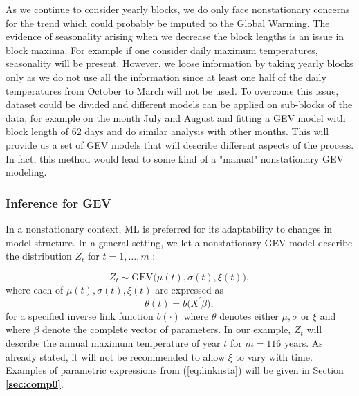 As we continue to consider yearly blocks, we do only face nonstationary concerns for the trend which could probably be imputed to the Global Warming. 
The evidence of seasonality arising when we decrease the block lengths is an issue in block maxima. For example if one consider daily maximum temperatures, seasonality will be present.
 However, we loose information by taking yearly blocks only as we do not use all the information since at least one half of the daily temperatures from October to March will not be used. To overcome this issue, dataset could be divided and different models can be applied on sub-blocks of the data, for example on the month July and August and fitting a GEV model with block length of 62 days and do similar analysis with other months. This will provide us a set of GEV models that will  describe different aspects of the process. In fact, this method would lead to some kind of a "manual" nonstationary GEV modeling.


\subsubsection*{Inference for GEV}

In a nonstationary context, ML is preferred for its adaptability to changes in model structure. In a general setting, we let a nonstationary GEV model describe the distribution $Z_t$ for $t=1,\ldots,m$ :

\begin{equation}\label{eq:gevnsta}
Z_t\sim \text{GEV}\big(\mu(t), \sigma(t),\xi(t)\big),
\end{equation}
where each of $\mu(t),\sigma(t), \xi(t)$ are expressed as 
\begin{equation}\label{eq:linknsta}
\theta(t)=b\big(X^{'}\beta\big),
\end{equation}
for a specified inverse link function $b(\cdot)$ where $\theta$ denotes either $\mu,\sigma$ or $\xi$ and where $\beta$ denote the complete vector of parameters. In our example, $Z_t$ will describe the annual maximum temperature of year $t$ for $m=116$ years.
As already stated, it will not be recommended to allow $\xi$ to vary with time. Examples of parametric expressions from (\ref{eq:linknsta}) will be given in \hyperref[sec:comp0]{Section \textbf{\ref{sec:comp0}}}.

